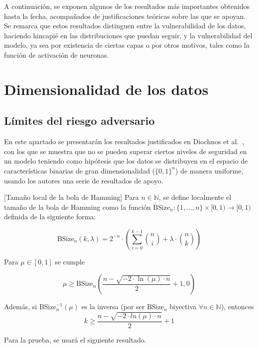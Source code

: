 A continuación, se exponen algunos de los resultados más importantes obtenidos hasta la fecha, acompañados de justificaciones teóricas sobre las que se apoyan. Se remarca que estos resultados distinguen entre la vulnerabilidad de los datos, haciendo hincapié en las distribuciones que puedan seguir, y la vulnerabilidad del modelo, ya sea por existencia de ciertas capas o por otros motivos, tales como la función de activación de neuronas.


\section{Dimensionalidad de los datos}
\subsection{Límites del riesgo adversario}
En este apartado se presentarán los resultados justificados en  Diochnos et al.~\cite{LimitsAdvers}, con los que se muestra que no se pueden superar ciertos niveles de seguridad en un modelo teniendo como hipótesis que los datos se distribuyen en el espacio de características binarias de gran dimensionalidad (\(\{0,1\}^n\)) de manera uniforme, usando los autores una serie de resultados de apoyo.



\begin{definicion}{}[Tamaño local de la bola de Hamming]
Para $n \in \mathbb{N}$, se define localmente el tamaño de la bola de Hamming como la función $\text{BSize}_n: \{1,\ldots,n\} \times [0,1) \to [0,1)$ definida de la siguiente forma: 

$$\text{BSize}_n(k,\lambda)=2^{-n}\cdot \left( \sum_{i=0}^{k-1} \binom{n}{i} + \lambda\cdot\binom{n}{k} \right)$$

\end{definicion}

\begin{lema} \label{lem21}
Para $\mu \in [0,1]$ se cumple

\[
\mu \geq \text{BSize}_n\left(\frac{n-\sqrt{-2\cdot\ln(\mu)\cdot n}}{2}+1,0\right)
\]

Además, si $\text{BSize}_n^{-1}(\mu)$ es la inversa (por ser $\text{BSize}_n$ biyectiva $\forall n \in \mathbb{N}$), entonces 
$$k \geq \frac{n-\sqrt{-2\cdot ln(\mu)\cdot n}}{2}+1$$
\end{lema}

Para la prueba, se usará el siguiente resultado.

